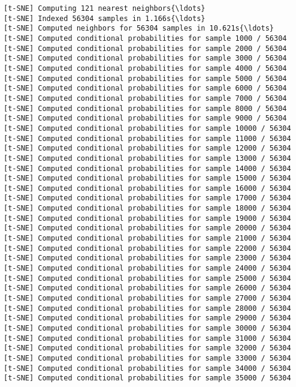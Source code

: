 \documentclass[11pt]{article}
\begin{document}
    \begin{Verbatim}[commandchars=\\\{\}]
[t-SNE] Computing 121 nearest neighbors{\ldots}
[t-SNE] Indexed 56304 samples in 1.166s{\ldots}
[t-SNE] Computed neighbors for 56304 samples in 10.621s{\ldots}
[t-SNE] Computed conditional probabilities for sample 1000 / 56304
[t-SNE] Computed conditional probabilities for sample 2000 / 56304
[t-SNE] Computed conditional probabilities for sample 3000 / 56304
[t-SNE] Computed conditional probabilities for sample 4000 / 56304
[t-SNE] Computed conditional probabilities for sample 5000 / 56304
[t-SNE] Computed conditional probabilities for sample 6000 / 56304
[t-SNE] Computed conditional probabilities for sample 7000 / 56304
[t-SNE] Computed conditional probabilities for sample 8000 / 56304
[t-SNE] Computed conditional probabilities for sample 9000 / 56304
[t-SNE] Computed conditional probabilities for sample 10000 / 56304
[t-SNE] Computed conditional probabilities for sample 11000 / 56304
[t-SNE] Computed conditional probabilities for sample 12000 / 56304
[t-SNE] Computed conditional probabilities for sample 13000 / 56304
[t-SNE] Computed conditional probabilities for sample 14000 / 56304
[t-SNE] Computed conditional probabilities for sample 15000 / 56304
[t-SNE] Computed conditional probabilities for sample 16000 / 56304
[t-SNE] Computed conditional probabilities for sample 17000 / 56304
[t-SNE] Computed conditional probabilities for sample 18000 / 56304
[t-SNE] Computed conditional probabilities for sample 19000 / 56304
[t-SNE] Computed conditional probabilities for sample 20000 / 56304
[t-SNE] Computed conditional probabilities for sample 21000 / 56304
[t-SNE] Computed conditional probabilities for sample 22000 / 56304
[t-SNE] Computed conditional probabilities for sample 23000 / 56304
[t-SNE] Computed conditional probabilities for sample 24000 / 56304
[t-SNE] Computed conditional probabilities for sample 25000 / 56304
[t-SNE] Computed conditional probabilities for sample 26000 / 56304
[t-SNE] Computed conditional probabilities for sample 27000 / 56304
[t-SNE] Computed conditional probabilities for sample 28000 / 56304
[t-SNE] Computed conditional probabilities for sample 29000 / 56304
[t-SNE] Computed conditional probabilities for sample 30000 / 56304
[t-SNE] Computed conditional probabilities for sample 31000 / 56304
[t-SNE] Computed conditional probabilities for sample 32000 / 56304
[t-SNE] Computed conditional probabilities for sample 33000 / 56304
[t-SNE] Computed conditional probabilities for sample 34000 / 56304
[t-SNE] Computed conditional probabilities for sample 35000 / 56304

\end{Verbatim}
\end{document}
